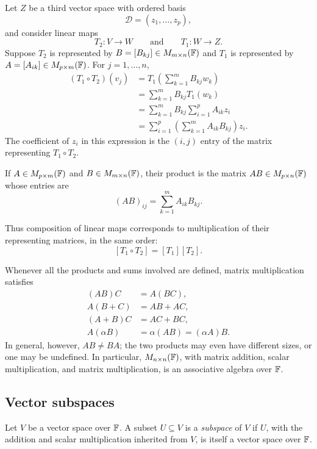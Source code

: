 Let $Z$ be a third vector space with ordered basis
\[
  \mathcal D=(z_1,\ldots,z_p),
\]
and consider linear maps
\[
  T_2\colon V\longrightarrow W
  \qquad\text{and}\qquad
  T_1\colon W\longrightarrow Z.
\]
Suppose $T_2$ is represented by $B=[B_{kj}]\in
M_{m\times n}(\mathbb{F})$ and $T_1$ is represented by
$A=[A_{ik}]\in M_{p\times m}(\mathbb{F})$. For $j=1,\ldots,n$,
\begin{align*}
  (T_1\circ T_2)(v_j)
  &=T_1\left(\sum_{k=1}^m B_{kj}w_k\right) \\
  &=\sum_{k=1}^m B_{kj}T_1(w_k) \\
  &=\sum_{k=1}^m B_{kj}\sum_{i=1}^p A_{ik}z_i \\
  &=\sum_{i=1}^p\left(\sum_{k=1}^m A_{ik}B_{kj}\right)z_i.
\end{align*}
The coefficient of $z_i$ in this expression is the $(i,j)$ entry of
the matrix representing $T_1\circ T_2$.

\begin{definition}
  If $A\in M_{p\times m}(\mathbb{F})$ and
  $B\in M_{m\times n}(\mathbb{F})$, their product is the matrix
  $AB\in M_{p\times n}(\mathbb{F})$ whose entries are
  \[
    (AB)_{ij}=\sum_{k=1}^m A_{ik}B_{kj}.
  \]
\end{definition}

Thus composition of linear maps corresponds to multiplication of their
representing matrices, in the same order:
\[
  [T_1\circ T_2]=[T_1][T_2].
\]

Whenever all the products and sums involved are defined, matrix
multiplication satisfies
\begin{align*}
  (AB)C&=A(BC), \\
  A(B+C)&=AB+AC, \\
  (A+B)C&=AC+BC, \\
  A(\alpha B)&=\alpha(AB)=(\alpha A)B.
\end{align*}
In general, however, $AB\neq BA$; the two products may even have
different sizes, or one may be undefined. In particular,
$M_{n\times n}(\mathbb{F})$, with matrix addition, scalar multiplication,
and matrix multiplication, is an associative algebra over $\mathbb{F}$.

\subsection{Vector subspaces}

\begin{definition}[Subspace]
  Let $V$ be a vector space over $\mathbb{F}$. A subset $U\subseteq V$ is a
  \emph{subspace} of $V$ if $U$, with the addition and scalar
  multiplication inherited from $V$, is itself a vector space over
  $\mathbb{F}$.
\end{definition}

